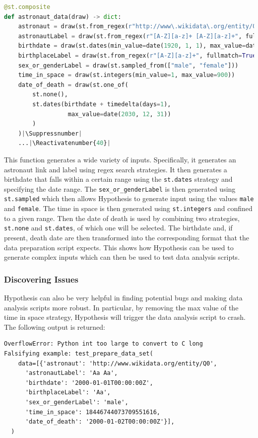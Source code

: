 \documentclass[runningheads]{llncs}
\makeatletter
\let\origthelstnumber\thelstnumber
\newcommand*\Suppressnumber{%
  \lst@AddToHook{OnNewLine}{%
    \let\thelstnumber\relax%
     \advance\c@lstnumber-\@ne\relax%
    }%
}
\newcommand*\Reactivatenumber[1]{%
  \setcounter{lstnumber}{\numexpr#1-1\relax}
  \lst@AddToHook{OnNewLine}{%
   \let\thelstnumber\origthelstnumber%
   \refstepcounter{lstnumber}%
  }%
}
\makeatother
\begin{document}
\begin{lstlisting}[language=Python,caption={Prepare Data Set from code/data\_analysis.ipynb}]
@st.composite
def astronaut_data(draw) -> dict:
    astronaut = draw(st.from_regex(r"http://www\.wikidata\.org/entity/Q\d+", fullmatch=True))
    astronautLabel = draw(st.from_regex(r"[A-Z][a-z]+ [A-Z][a-z]+", fullmatch=True))
    birthdate = draw(st.dates(min_value=date(1920, 1, 1), max_value=date(2030, 12, 31)))
    birthplaceLabel = draw(st.from_regex(r"[A-Z][a-z]+", fullmatch=True))
    sex_or_genderLabel = draw(st.sampled_from(["male", "female"]))
    time_in_space = draw(st.integers(min_value=1, max_value=900)) 
    date_of_death = draw(st.one_of(
        st.none(), 
        st.dates(birthdate + timedelta(days=1), 
                  max_value=date(2030, 12, 31))
        )
    )|\Suppressnumber|
    ...|\Reactivatenumber{40}|

\end{lstlisting}
This function generates a wide variety of inputs. Specifically, it generates an astronaut link and label using regex search strategies. It then generates a birthdate that falls within a certain range using the \texttt{st.dates} strategy and specifying the date range. The \texttt{sex\_or\_genderLabel} is then generated using \texttt{st.sampled} which then allows Hypothesis to generate input using the values \texttt{male} and \texttt{female}. The time in space is then generated using \texttt{st.integers} and confined to a given range. Then the date of death is used by combining two strategies, \texttt{st.none} and \texttt{st.dates}, of which one will be selected. The birthdate and, if present, death date are then transformed into the corresponding format that the data preparation script expects. This shows how Hypothesis can be used to generate complex inputs which can then be used to test data analysis scripts.

\subsubsection{Discovering Issues}
Hypothesis can also be very helpful in finding potential bugs and making data analysis scripts more robust. In particular, by removing the max value of the time in space strategy, Hypothesis will trigger the data analysis script to crash. The following output is returned:

\begin{verbatim}
OverflowError: Python int too large to convert to C long
Falsifying example: test_prepare_data_set(
    data=[{'astronaut': 'http://www.wikidata.org/entity/Q0',
      'astronautLabel': 'Aa Aa',
      'birthdate': '2000-01-01T00:00:00Z',
      'birthplaceLabel': 'Aa',
      'sex_or_genderLabel': 'male',
      'time_in_space': 18446744073709551616,
      'date_of_death': '2000-01-02T00:00:00Z'}],
  )
\end{verbatim}
\end{document}
